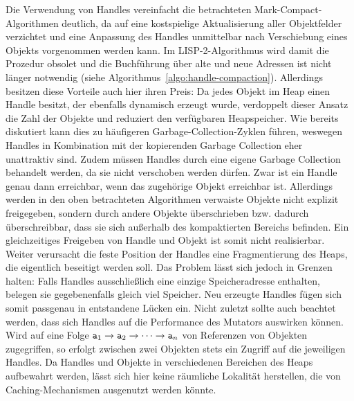Die Verwendung von Handles vereinfacht die betrachteten Mark-Compact-Algorithmen deutlich, da auf eine kostspielige Aktualisierung aller Objektfelder verzichtet und eine Anpassung des Handles unmittelbar nach Verschiebung eines Objekts vorgenommen werden kann.
Im LISP-2-Algorithmus wird damit die Prozedur  obsolet und die Buchführung über alte und neue Adressen ist nicht länger notwendig (siehe Algorithmus~\ref{algo:handle-compaction}).
Allerdings besitzen diese Vorteile auch hier ihren Preis:
Da jedes Objekt im Heap einen Handle besitzt, der ebenfalls dynamisch erzeugt wurde, verdoppelt dieser Ansatz die Zahl der Objekte und reduziert den verfügbaren Heapspeicher.
Wie bereits diskutiert kann dies zu häufigeren Garbage-Collection-Zyklen führen, weswegen Handles in Kombination mit der kopierenden Garbage Collection eher unattraktiv sind.
Zudem müssen Handles durch eine eigene Garbage Collection behandelt werden, da sie nicht verschoben werden dürfen.
Zwar ist ein Handle genau dann erreichbar, wenn das zugehörige Objekt erreichbar ist.
Allerdings werden in den oben betrachteten Algorithmen verwaiste Objekte nicht explizit freigegeben, sondern durch andere Objekte überschrieben bzw. dadurch überschreibbar, dass sie sich außerhalb des kompaktierten Bereichs befinden.
Ein gleichzeitiges Freigeben von Handle und Objekt ist somit nicht realisierbar.
Weiter verursacht die feste Position der Handles eine Fragmentierung des Heaps, die eigentlich beseitigt werden soll.
Das Problem lässt sich jedoch in Grenzen halten:
Falls Handles ausschließlich eine einzige Speicheradresse enthalten, belegen sie gegebenenfalls gleich viel Speicher.
Neu erzeugte Handles fügen sich somit passgenau in entstandene Lücken ein.
Nicht zuletzt sollte auch beachtet werden, dass sich Handles auf die Performance des Mutators auswirken können.
Wird auf eine Folge $\texttt{a}_1 \rightarrow \texttt{a}_2 \rightarrow \dots \rightarrow \texttt{a}_n$ von Referenzen von Objekten zugegriffen, so erfolgt zwischen zwei Objekten stets ein Zugriff auf die jeweiligen Handles.
Da Handles und Objekte in verschiedenen Bereichen des Heaps aufbewahrt werden, lässt sich hier keine räumliche Lokalität herstellen, die von Caching-Mechanismen ausgenutzt werden könnte.

